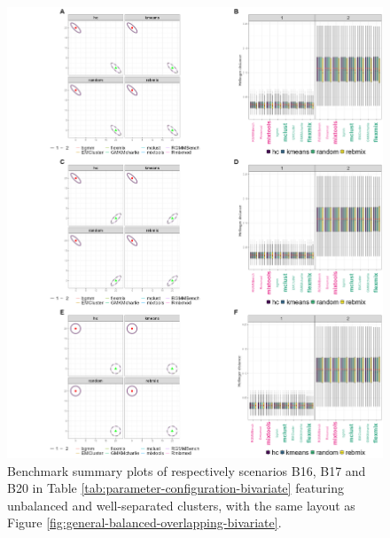 \begin{figure}

{\centering \includegraphics[width=1\linewidth]{figs/bivariate/multivariate_unbalanced_well_separated} 

}

\caption{Benchmark summary plots of respectively scenarios B16, B17 and B20 in Table \ref{tab:parameter-configuration-bivariate} featuring unbalanced and well-separated clusters, with the same layout as Figure \ref{fig:general-balanced-overlapping-bivariate}.}\label{fig:general-unbalanced-well-separated-bivariate}
\end{figure}

